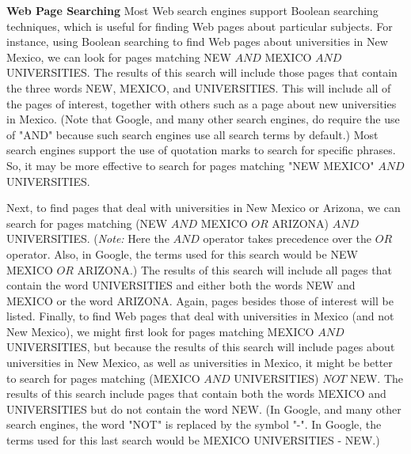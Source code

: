 \documentclass{Axon}
\begin{document}
\begin{example}\label{Example: 6}
    \textbf{Web Page Searching} Most Web search engines support Boolean searching techniques, which is useful for finding Web pages about particular subjects. For instance, using Boolean searching to find Web pages about universities in New Mexico, we can look for pages matching NEW \(AND\) MEXICO \(AND\) UNIVERSITIES. The results of this search will include those pages that contain the three words NEW, MEXICO, and UNIVERSITIES. This will include all of the pages of interest, together with others such as a page about new universities in Mexico. (Note that Google, and many other search engines, do require the use of "AND" because such search engines use all search terms by default.) Most search engines support the use of quotation marks to search for specific phrases. So, it may be more effective to search for pages matching "NEW MEXICO" \(AND\) UNIVERSITIES.

    Next, to find pages that deal with universities in New Mexico or Arizona, we can search for pages matching (NEW \(AND\) MEXICO \(OR\) ARIZONA) \(AND\) UNIVERSITIES. (\textit{Note:} Here the \(AND\) operator takes precedence over the \(OR\) operator. Also, in Google, the terms used for this search would be NEW MEXICO \(OR\) ARIZONA.) The results of this search will include all pages that contain the word UNIVERSITIES and either both the words NEW and MEXICO or the word ARIZONA. Again, pages besides those of interest will be listed. Finally, to find Web pages that deal with universities in Mexico (and not New Mexico), we might first look for pages matching MEXICO \(AND\) UNIVERSITIES, but because the results of this search will include pages about universities in New Mexico, as well as universities in Mexico, it might be better to search for pages matching (MEXICO \(AND\) UNIVERSITIES) \(NOT\) NEW. The results of this search include pages that contain both the words MEXICO and UNIVERSITIES but do not contain the word NEW. (In Google, and many other search engines, the word "NOT" is replaced by the symbol "-". In Google, the terms used for this last search would be MEXICO UNIVERSITIES - NEW.)
\end{example}

\printbibliography
\end{document}
